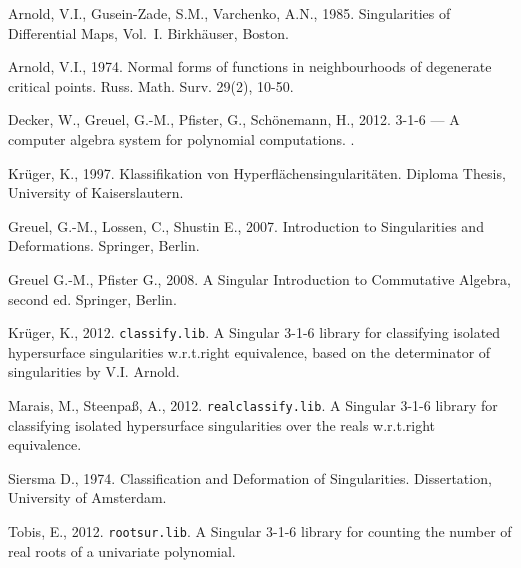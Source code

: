 \documentclass[noend]{amsproc}
\theoremstyle{definition}
\begin{document}
\begin{thebibliography}{99}
Arnold, V.I., Gusein-Zade, S.M., Varchenko, A.N., 1985.
Singularities of Differential Maps, Vol.~I.
Birkh\"auser, Boston.

Arnold, V.I., 1974.
Normal forms of functions in neighbourhoods of degenerate critical points.
Russ. Math. Surv. 29(2), 10-50.

Decker, W., Greuel, G.-M., Pfister, G., Sch{\"o}nemann, H., 2012.
 {3-1-6} --- {A} computer algebra system for polynomial
computations.
.

Kr\"uger, K., 1997.
Klassifikation von Hyperfl\"achensingularit\"aten.
Diploma Thesis, University of Kaiserslautern.

Greuel, G.-M., Lossen, C., Shustin E., 2007.
Introduction to Singularities and Deformations.
Springer, Berlin.

Greuel G.-M., Pfister G., 2008.
A Singular Introduction to Commutative Algebra, second ed.
Springer, Berlin.

Kr\"uger, K., 2012.
{\tt classify.lib}. {A} {\sc Singular} {3-1-6} library for classifying isolated
hypersurface singularities w.r.t.\@ right equivalence, based on the
determinator of singularities by V.I. Arnold.

Marais, M., Steenpa\ss, A., 2012.
{\tt realclassify.lib}. {A} {\sc Singular} {3-1-6} library for classifying
isolated hypersurface singularities over the reals w.r.t.\@ right equivalence.

Siersma D., 1974.
Classification and Deformation of Singularities.
Dissertation, University of Amsterdam.

Tobis, E., 2012.
{\tt rootsur.lib}. {A} {\sc Singular} {3-1-6} library for counting the number
of real roots of a univariate polynomial.
\end{thebibliography}
\end{document}
